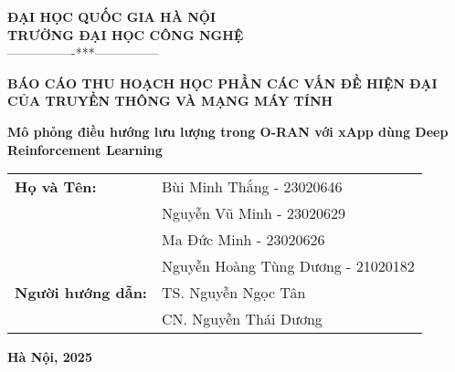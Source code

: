 
\begin{titlepage}
    \begin{center}
        \large\textbf{ĐẠI HỌC QUỐC GIA HÀ NỘI}\\
        \large\textbf{TRƯỜNG ĐẠI HỌC CÔNG NGHỆ}\\
        ----------------***---------------

        \vspace{3cm}
        {\large\textbf{BÁO CÁO THU HOẠCH HỌC PHẦN CÁC VẤN ĐỀ HIỆN ĐẠI CỦA TRUYỀN THÔNG VÀ MẠNG MÁY TÍNH}}

        \vspace{3cm}
        {\huge\textbf{Mô phỏng điều hướng lưu lượng trong O-RAN với xApp dùng Deep Reinforcement Learning}}

        \vfill
        \begin{table}[h]
            \centering
            \large
            \begin{tabular}{ll}
                \textbf{Họ và Tên:} & Bùi Minh Thắng - 23020646 \\
                \textbf{          } & Nguyễn Vũ Minh - 23020629 \\
                \textbf{          } & Ma Đức Minh - 23020626 \\
                \textbf{          } & Nguyễn Hoàng Tùng Dương - 21020182 \\
                \textbf{Người hướng dẫn:} & TS. Nguyễn Ngọc Tân \\
                \textbf{                } & CN. Nguyễn Thái Dương \\
            \end{tabular}
        \end{table}

        \vspace{4cm}
        \textbf{Hà Nội, 2025}
        
    \end{center}
\end{titlepage}